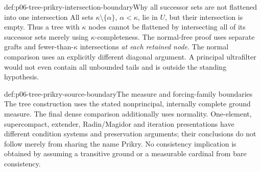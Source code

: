 \begin{hbexample}{def:p06-tree-prikry-intersection-boundary}{Why all successor sets are not flattened into one intersection}
All sets \(\kappa\setminus\{\alpha\}\), \(\alpha<\kappa\), lie
in \(U\), but their intersection is empty. Thus a tree with
\(\kappa\) nodes cannot be flattened by intersecting all of its
successor sets merely using \(\kappa\)-completeness. The normal-free
proof uses separate grafts and fewer-than-\(\kappa\) intersections
\emph{at each retained node}. The normal comparison uses an explicitly
different diagonal argument. A principal ultrafilter would not even
contain all unbounded tails and is outside the standing hypothesis.
\end{hbexample}

\begin{proofboundary}{def:p06-tree-prikry-source-boundary}{The measure and forcing-family boundaries}
The tree construction uses the stated nonprincipal, internally complete
ground measure. The final dense comparison additionally uses normality.
One-element, supercompact, extender, Radin/Magidor and iteration
presentations have different condition systems and preservation arguments;
their conclusions do not follow merely from sharing the name Prikry.
No consistency implication is obtained by assuming a transitive ground
or a measurable cardinal from bare consistency.
\end{proofboundary}

